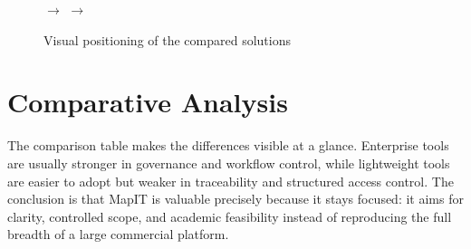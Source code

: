 \begin{figure}[H]
\centering
{}
\hspace{0.4cm}$\rightarrow$\hspace{0.4cm}
\hspace{0.4cm}$\rightarrow$\hspace{0.4cm}
\caption{Visual positioning of the compared solutions}
\label{fig:solution-positioning}
\end{figure}

\section{Comparative Analysis}
The comparison table makes the differences visible at a glance. Enterprise tools are usually stronger in governance and workflow control, while lightweight tools are easier to adopt but weaker in traceability and structured access control. The conclusion is that MapIT is valuable precisely because it stays focused: it aims for clarity, controlled scope, and academic feasibility instead of reproducing the full breadth of a large commercial platform.


